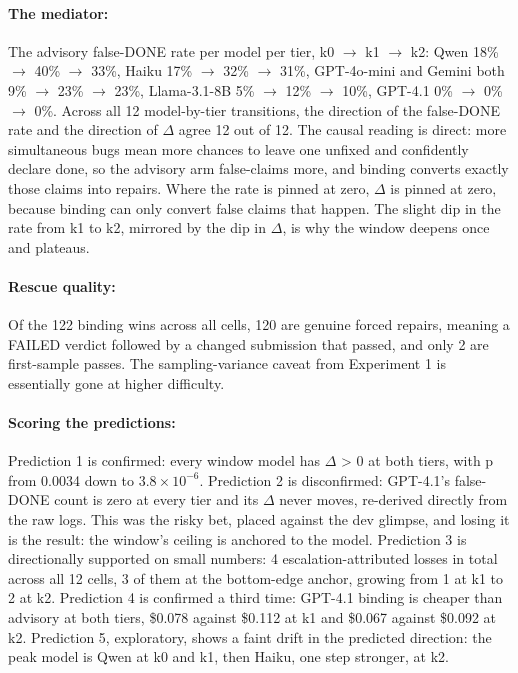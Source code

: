 \paragraph{The mediator:} The advisory false-DONE rate per model per tier, k0 $\rightarrow$ k1 $\rightarrow$ k2: Qwen 18\% $\rightarrow$ 40\% $\rightarrow$ 33\%, Haiku 17\% $\rightarrow$ 32\% $\rightarrow$ 31\%, GPT-4o-mini and Gemini both 9\% $\rightarrow$ 23\% $\rightarrow$ 23\%, Llama-3.1-8B 5\% $\rightarrow$ 12\% $\rightarrow$ 10\%, GPT-4.1 0\% $\rightarrow$ 0\% $\rightarrow$ 0\%. Across all 12 model-by-tier transitions, the direction of the false-DONE rate and the direction of $\Delta$ agree 12 out of 12. The causal reading is direct: more simultaneous bugs mean more chances to leave one unfixed and confidently declare done, so the advisory arm false-claims more, and binding converts exactly those claims into repairs. Where the rate is pinned at zero, $\Delta$ is pinned at zero, because binding can only convert false claims that happen. The slight dip in the rate from k1 to k2, mirrored by the dip in $\Delta$, is why the window deepens once and plateaus.

\paragraph{Rescue quality:} Of the 122 binding wins across all cells, 120 are genuine forced repairs, meaning a FAILED verdict followed by a changed submission that passed, and only 2 are first-sample passes. The sampling-variance caveat from Experiment 1 is essentially gone at higher difficulty.

\paragraph{Scoring the predictions:} Prediction 1 is confirmed: every window model has $\Delta$ > 0 at both tiers, with p from 0.0034 down to $3.8 \times 10^{-6}$. Prediction 2 is disconfirmed: GPT-4.1's false-DONE count is zero at every tier and its $\Delta$ never moves, re-derived directly from the raw logs. This was the risky bet, placed against the dev glimpse, and losing it is the result: the window's ceiling is anchored to the model. Prediction 3 is directionally supported on small numbers: 4 escalation-attributed losses in total across all 12 cells, 3 of them at the bottom-edge anchor, growing from 1 at k1 to 2 at k2. Prediction 4 is confirmed a third time: GPT-4.1 binding is cheaper than advisory at both tiers, \$0.078 against \$0.112 at k1 and \$0.067 against \$0.092 at k2. Prediction 5, exploratory, shows a faint drift in the predicted direction: the peak model is Qwen at k0 and k1, then Haiku, one step stronger, at k2.

